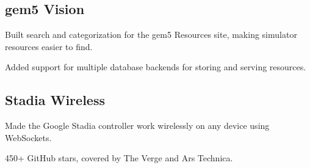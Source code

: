 \documentclass[]{deedy-resume-openfont}
\begin{document}
\subsection*{gem5 Vision}
\vspace{\topsep}
\begin{tightemize}
\item Built search and categorization for the gem5 Resources site, making simulator resources easier to find.
\item Added support for multiple database backends for storing and serving resources.
\end{tightemize}
\sectionsep

\subsection*{Stadia Wireless}
\vspace{\topsep}
\begin{tightemize}
\item Made the Google Stadia controller work wirelessly on any device using WebSockets.
\item 450+ GitHub stars, covered by The Verge and Ars Technica.
\end{tightemize}
\end{document}
